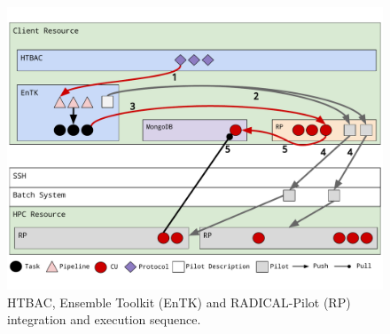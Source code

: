 






  
\begin{figure}
  \centering
  \includegraphics[width=\columnwidth]{figures/ht-bac-rp_integration.pdf}
  \caption{HTBAC, Ensemble Toolkit (EnTK) and RADICAL-Pilot (RP) integration 
  and execution sequence.}
\label{fig:integration}
\end{figure}

